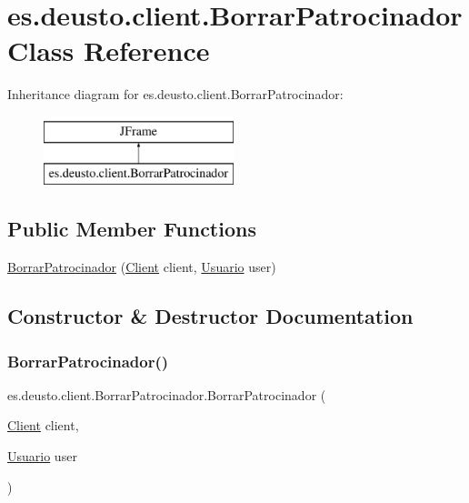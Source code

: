 \hypertarget{classes_1_1deusto_1_1client_1_1_borrar_patrocinador}{}\section{es.\+deusto.\+client.\+Borrar\+Patrocinador Class Reference}
\label{classes_1_1deusto_1_1client_1_1_borrar_patrocinador}
Inheritance diagram for es.\+deusto.\+client.\+Borrar\+Patrocinador\+:\begin{figure}[H]
\begin{center}
\leavevmode
\includegraphics[height=2.000000cm]{classes_1_1deusto_1_1client_1_1_borrar_patrocinador}
\end{center}
\end{figure}
\subsection*{Public Member Functions}
\begin{DoxyCompactItemize}
\item 
\mbox{\hyperlink{classes_1_1deusto_1_1client_1_1_borrar_patrocinador_a548f7d483b83e58660b9ed0c0aa2dac2}{Borrar\+Patrocinador}} (\mbox{\hyperlink{classes_1_1deusto_1_1client_1_1_client}{Client}} client, \mbox{\hyperlink{classes_1_1deusto_1_1server_1_1jdo_1_1_usuario}{Usuario}} user)
\end{DoxyCompactItemize}


\subsection{Constructor \& Destructor Documentation}
\mbox{\label{classes_1_1deusto_1_1client_1_1_borrar_patrocinador_a548f7d483b83e58660b9ed0c0aa2dac2}} 
\subsubsection{\texorpdfstring{BorrarPatrocinador()}{BorrarPatrocinador()}}
{\footnotesize\ttfamily es.\+deusto.\+client.\+Borrar\+Patrocinador.\+Borrar\+Patrocinador (\begin{DoxyParamCaption}\item[{\mbox{\hyperlink{classes_1_1deusto_1_1client_1_1_client}{Client}}}]{client,  }\item[{\mbox{\hyperlink{classes_1_1deusto_1_1server_1_1jdo_1_1_usuario}{Usuario}}}]{user }\end{DoxyParamCaption})}



